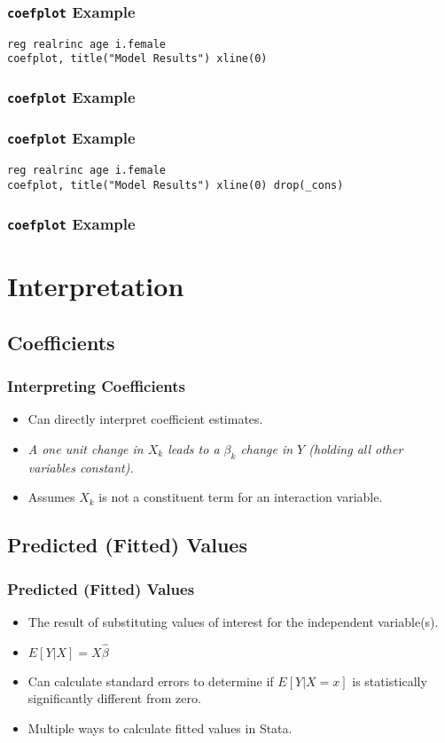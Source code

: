 \documentclass{beamer}
\begin{document}
\begin{frame}
	\frametitle{\texttt{coefplot} Example}
		\texttt{reg realrinc age i.female}\\
		\texttt{coefplot, title("Model Results") xline(0)}
\end{frame}

\begin{frame}
	\frametitle{\texttt{coefplot} Example}
\end{frame}

\begin{frame}
	\frametitle{\texttt{coefplot} Example}
		\texttt{reg realrinc age i.female}\\
		\texttt{coefplot, title("Model Results") xline(0) drop(\_cons)}
\end{frame}

\begin{frame}
	\frametitle{\texttt{coefplot} Example}
\end{frame}

\section{Interpretation}
\subsection{Coefficients}

\begin{frame}
	\frametitle{Interpreting Coefficients}
		\begin{itemize}
			\item Can directly interpret coefficient estimates.
			\item \textit{A one unit change in $X_{k}$ leads to a $\beta_{k}$ change in $Y$ (holding all other variables constant).}
			\item Assumes $X_{k}$ is not a constituent term for an interaction variable. 
		\end{itemize}
\end{frame}

\subsection{Predicted (Fitted) Values}

\begin{frame}
	\frametitle{Predicted (Fitted) Values}
		\begin{itemize}
			\item The result of substituting values of interest for the independent variable(s).
			\item $E[Y|X]=X\hat{\beta}$
			\item Can calculate standard errors to determine if $E[Y|X=x]$ is statistically significantly different from zero.
			\item Multiple ways to calculate fitted values in Stata.
		\end{itemize}
\end{frame}
\end{document}
